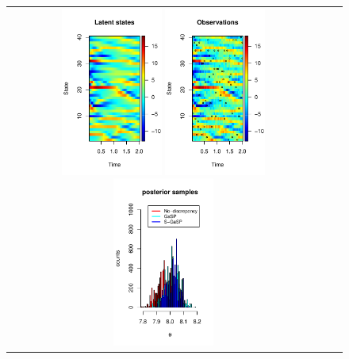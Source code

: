     \begin{figure}[t]
\centering
  \begin{tabular}{ccc}

	\hspace{-.1in} \includegraphics[height=0.5\textwidth,width=0.33\textwidth]{figures/Lorenz_96_reality.pdf}
	\hspace{-.1in} \includegraphics[height=0.5\textwidth,width=0.33\textwidth]{figures/Lorenz_96_obs.pdf}
		\hspace{-.1in} \includegraphics[height=0.5\textwidth,width=0.33\textwidth]{figures/sample_theta_Lorenz_96.pdf} \vspace{-.3in} \\

\end{tabular}
\end{figure}
